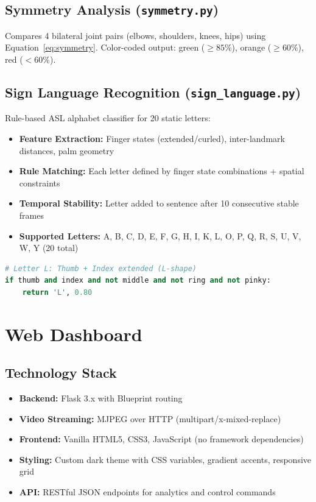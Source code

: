 \documentclass[a4paper,12pt]{report}
\begin{document}
\section{Symmetry Analysis (\texttt{symmetry.py})}
Compares 4 bilateral joint pairs (elbows, shoulders, knees, hips) using Equation~\ref{eq:symmetry}. Color-coded output: green ($\geq 85\%$), orange ($\geq 60\%$), red ($< 60\%$).

\section{Sign Language Recognition (\texttt{sign\_language.py})}
Rule-based ASL alphabet classifier for 20 static letters:

\begin{itemize}
    \item \textbf{Feature Extraction:} Finger states (extended/curled), inter-landmark distances, palm geometry
    \item \textbf{Rule Matching:} Each letter defined by finger state combinations + spatial constraints
    \item \textbf{Temporal Stability:} Letter added to sentence after 10 consecutive stable frames
    \item \textbf{Supported Letters:} A, B, C, D, E, F, G, H, I, K, L, O, P, Q, R, S, U, V, W, Y (20 total)
\end{itemize}

\begin{lstlisting}[language=Python, caption=Sign Language Classifier -- Letter L Detection, label=lst:sign_lang]
# Letter L: Thumb + Index extended (L-shape)
if thumb and index and not middle and not ring and not pinky:
    return 'L', 0.80
\end{lstlisting}

\newpage

\chapter{Web Dashboard}
\thispagestyle{contentpages}
\justifying

\section{Technology Stack}
\begin{itemize}
    \item \textbf{Backend:} Flask 3.x \cite{flask2010} with Blueprint routing
    \item \textbf{Video Streaming:} MJPEG over HTTP (multipart/x-mixed-replace)
    \item \textbf{Frontend:} Vanilla HTML5, CSS3, JavaScript (no framework dependencies)
    \item \textbf{Styling:} Custom dark theme with CSS variables, gradient accents, responsive grid
    \item \textbf{API:} RESTful JSON endpoints for analytics and control commands
\end{itemize}
\end{document}

